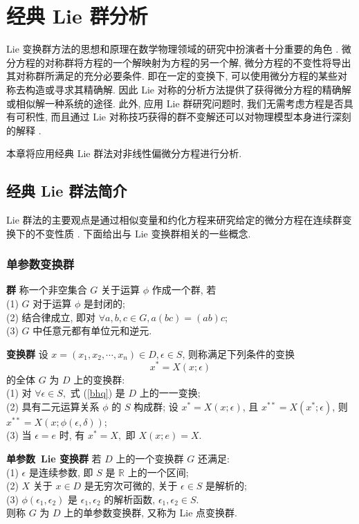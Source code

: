 ﻿\chapter{经典 Lie 群分析}
Lie 变换群方法的思想和原理在数学物理领域的研究中扮演者十分重要的角色 \cite{KSG2013,JK2011,CA2009,AC2011,ALi2014}. 微分方程的对称群将方程的一个解映射为方程的另一个解, 微分方程的不变性将导出其对称群所满足的充分必要条件. 即在一定的变换下, 可以使用微分方程的某些对称去构造或寻求其精确解. 因此 Lie 对称的分析方法提供了获得微分方程的精确解或相似解一种系统的途径. 此外, 应用 Lie 群研究问题时, 我们无需考虑方程是否具有可积性, 而且通过 Lie 对称技巧获得的群不变解还可以对物理模型本身进行深刻的解释 \cite{Bluman2002,Olver1993}.

本章将应用经典 Lie 群法对非线性偏微分方程进行分析.
\section{经典 Lie 群法简介}
Lie 群法的主要观点是通过相似变量和约化方程来研究给定的微分方程在连续群变换下的不变性质 \cite{Olver1993}. 下面给出与 Lie 变换群相关的一些概念.
\subsection{单参数变换群}

\textbf{群} 称一个非空集合 $G$ 关于运算 $\phi$ 作成一个群, 若\\
(1) $G$ 对于运算 $\phi$ 是封闭的;\\
(2) 结合律成立, 即对 $\forall a,b,c\in G, a(bc)=(ab)c$;\\
(3) $G$ 中任意元都有单位元和逆元.


\textbf{变换群} 设 $x=(x_1,x_2,\cdots,x_n)\in D, \epsilon\in S$, 则称满足下列条件的变换
\begin{equation}\label{bhq}
x^*=X(x;\epsilon)
\end{equation}
的全体 $G$ 为 $D$ 上的变换群:\\
(1) 对 $\forall \epsilon\in S, $ 式 (\ref{bhq}) 是 $D$ 上的一一变换;\\
(2) 具有二元运算关系 $\phi$ 的 $S$ 构成群; 设 $x^*=X(x;\epsilon)$, 且 $x^{**}=X(x^*;\epsilon)$, 则 $x^{**}=X(x;\phi(\epsilon,\delta))$;\\
(3) 当 $\epsilon=e$ 时, 有 $x^*=X,$ 即 $X(x;e)=X$.


\textbf{单参数~Lie 变换群} 若 $D$ 上的一个变换群 $G$ 还满足:\\
(1) $\epsilon$ 是连续参数, 即 $S$ 是 $\mathbb{R}$ 上的一个区间;\\
(2) $X$ 关于 $x\in D$ 是无穷次可微的, 关于 $\epsilon\in S$ 是解析的;\\
(3) $\phi(\epsilon_1,\epsilon_2)$ 是 $\epsilon_1,\epsilon_2$ 的解析函数, $\epsilon_1,\epsilon_2\in S$.\\
则称 $G$ 为 $D$ 上的单参数变换群, 又称为 Lie 点变换群.

